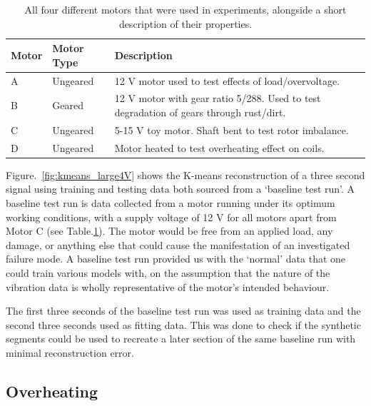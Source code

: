 \begin{table}[]
    \centering
    \begin{tabular}{|p{1cm}|p{1cm}|p{10cm}|}
    \hline
    \textbf{Motor}          & \textbf{Motor Type}        & \textbf{Description}                                                                          \\ \hline
    \multicolumn{1}{|l|}{A} & \multicolumn{1}{l|}{Ungeared} & 12 V motor used to test effects of load/overvoltage.                            \\
    \multicolumn{1}{|l|}{B} & \multicolumn{1}{l|}{Geared} & 12 V motor with gear ratio 5/288. Used to test degradation of gears through rust/dirt. \\
    \multicolumn{1}{|l|}{C} & \multicolumn{1}{l|}{Ungeared} & 5-15 V toy motor. Shaft bent to test rotor imbalance.                                \\
    \multicolumn{1}{|l|}{D} & \multicolumn{1}{l|}{Ungeared}   & Motor heated to test overheating effect on coils.                          \\ \hline
    \end{tabular}
    \caption[Motor Descriptions]{All four different motors that were used in experiments, alongside a short description of their properties.}
    \label{motor_table}
\end{table}

Figure.~\ref{fig:kmeans_large4V} shows the K-means reconstruction of a three second signal using training and testing data both sourced from a `baseline test run'. A baseline test run is data collected from a motor running under its optimum working conditions, with a supply voltage of 12 V for all motors apart from Motor C (see Table.\ref{motor_table}). The motor would be free from an applied load, any damage, or anything else that could cause the manifestation of an investigated failure mode. A baseline test run provided us with the `normal' data that one could train various models with, on the assumption that the nature of the vibration data is wholly representative of the motor's intended behaviour.

The first three seconds of the baseline test run was used as training data and the second three seconds used as fitting data. This was done to check if the synthetic segments could be used to recreate a later section of the same baseline run with minimal reconstruction error. 

\subsection{Overheating}

